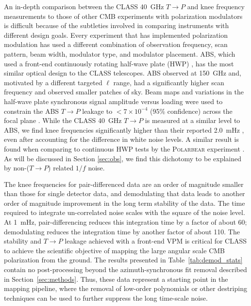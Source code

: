 \documentclass[twocolumn, tighten, numberedappendix, twocolappendix]{aastex63}
\begin{document}
An in-depth comparison between the CLASS 40~GHz $T\rightarrow P$ and knee frequency measurements to those of other CMB experiments with polarization modulators is difficult because of the subtleties involved in comparing instruments with different design goals. Every experiment that has implemented polarization modulation has used a different combination of observation frequency, scan pattern, beam width, modulator type, and modulator placement. ABS, which used a front-end continuously rotating half-wave plate (HWP) \citep{abs_hwp}, has the most similar optical design to the CLASS telescopes. ABS observed at 150~GHz and, motivated by a different targeted $\ell$ range, had a significantly higher scan frequency and observed smaller patches of sky. Beam maps and variations in the half-wave plate synchronous signal amplitude versus loading were used to constrain the ABS $T\rightarrow P$ leakage to $<7\times10^{-4}$ (95\% confidence) across the focal plane \citep{essinger2016}. While the CLASS 40~GHz $T\rightarrow P$ is measured at a similar level to ABS, we find knee frequencies significantly higher than their reported 2.0~mHz \citep{abs_hwp}, even after accounting for the difference in white noise levels. A similar result is found when comparing to continuous HWP tests by the \textsc{Polarbear} experiment \citep{Takakura2017}. As will be discussed in Section \ref{sec:obs}, we find this dichotomy to be explained by non-($T\rightarrow P$) related $1/f$ noise. 

The knee frequencies for pair-differenced data are an order of magnitude smaller than those for single detector data, and demodulating that data leads to another order of magnitude improvement in the long term stability of the data. The time required to integrate un-correlated noise scales with the square of the noise level. At 1~mHz, pair-differencing reduces this integration time by a factor of about 60; demodulating reduces the integration time by another factor of about 110. The stability and $T\rightarrow P$ leakage achieved with a front-end VPM is critical for CLASS to achieve the scientific objective of mapping the large angular scale CMB polarization from the ground. The results presented in Table~\ref{tab:demod_stats} contain no post-processing beyond the azimuth-synchronous fit removal described in Section~\ref{sec:methods}. Thus, these data represent a starting point in the mapping pipeline, where the removal of low-order polynomials or other destriping techniques can be used to further suppress the long time-scale noise.
\end{document}
